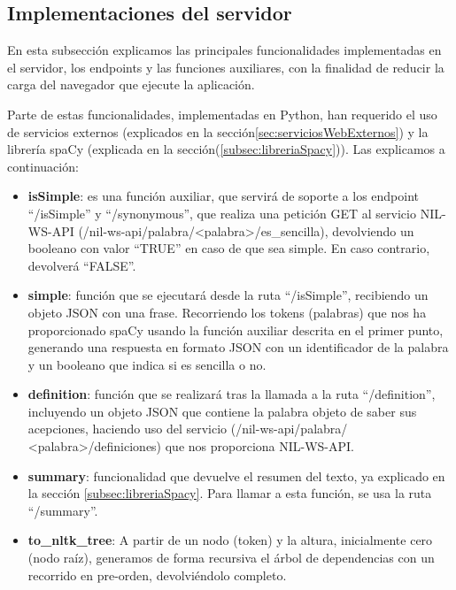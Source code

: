 \subsection{Implementaciones del servidor}\label{subsec:implementacionesServidor}

En esta subsección explicamos las principales funcionalidades implementadas en el servidor, los endpoints y las funciones auxiliares, con la finalidad de reducir la carga del navegador que ejecute la aplicación.

Parte de estas funcionalidades, implementadas en Python, han requerido el uso de servicios externos (explicados en la sección\ref{sec:serviciosWebExternos}) y la librería spaCy (explicada en la sección(\ref{subsec:libreriaSpacy})). Las explicamos a continuación:

\begin{itemize}
	\item \textbf{isSimple}: es una función auxiliar, que servirá de soporte a los endpoint ``/isSimple'' y ``/synonymous'', que realiza una petición GET al servicio NIL-WS-API (/nil-ws-api/palabra/<palabra>/es\_sencilla), devolviendo un booleano con valor ``TRUE'' en caso de que sea simple. En caso contrario, devolverá ``FALSE''.
	
	\item \textbf{simple}: función que se ejecutará desde la ruta ``/isSimple'', recibiendo un objeto JSON con una frase. Recorriendo los tokens (palabras) que nos ha proporcionado spaCy usando la función auxiliar descrita en el primer punto, generando una respuesta en formato JSON con un identificador de la palabra y un booleano que indica si es sencilla o no.
	
	\item \textbf{definition}: función que se realizará tras la llamada a la ruta ``/definition'', incluyendo un objeto JSON que contiene la palabra objeto de saber sus acepciones, haciendo uso del servicio (/nil-ws-api/palabra/ <palabra>/definiciones) que nos proporciona NIL-WS-API.
	
	\item \textbf{summary}: funcionalidad que devuelve el resumen del texto, ya explicado en la sección \ref{subsec:libreriaSpacy}. Para llamar a esta función, se usa la ruta ``/summary''. 
	
	\item \textbf{to\_nltk\_tree}: A partir de un nodo (token) y la altura, inicialmente cero (nodo raíz), generamos de forma recursiva el árbol de dependencias con un recorrido en pre-orden, devolviéndolo completo.
	

\end{itemize}
